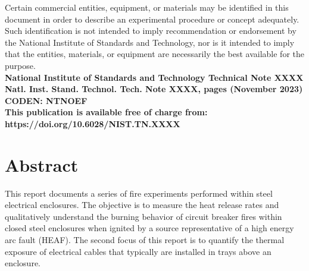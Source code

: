 \documentclass[12pt]{article}
\newcommand{\pubnumber}{XXXX}
\newcommand{\DOI}{https://doi.org/10.6028/NIST.TN.XXXX}
\newcommand{\monthyear}{November 2023}
\begin{document}
\begin{titlepage}
\begin{flushright}
\footnotesize  Certain commercial entities, equipment, or materials may be identified in this document in order to describe an experimental procedure or concept adequately. Such identification is not intended to imply recommendation or endorsement by the National Institute of Standards and Technology, nor is it intended to imply that the entities, materials, or equipment are necessarily the best available for the purpose.\\
\vfill
\normalsize \textbf{National Institute of Standards and Technology Technical Note \pubnumber\\
Natl. Inst. Stand. Technol. Tech. Note \pubnumber, \pageref{LastPage} pages (\monthyear)} \\
\textbf{CODEN: NTNOEF}\\
\vspace{12pt}
\textbf{This publication is available free of charge from: \DOI}
\vfill
\end{flushright}
\end{titlepage}


\section*{Abstract}

\normalsize This report documents a series of fire experiments performed within steel electrical enclosures. The objective is to measure the heat release rates and qualitatively understand the burning behavior of circuit breaker fires within closed steel enclosures when ignited by a source representative of a high energy arc fault (HEAF). The second focus of this report is to quantify the thermal exposure of electrical cables that typically are installed in trays above an enclosure.  \\
\end{document}
